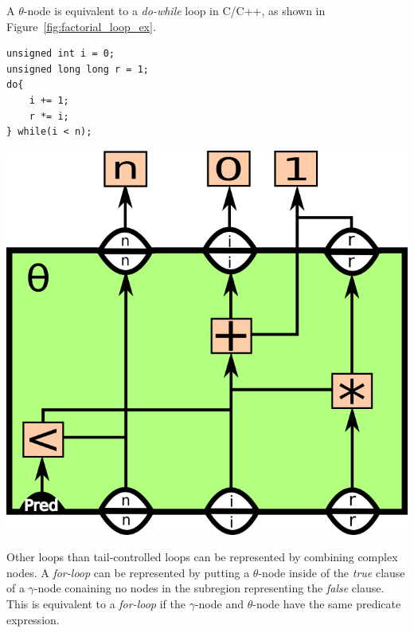\begin{itemize}
A $\theta$-node is equivalent to a \textit{do-while} loop in C/C++, as shown in
Figure~\ref{fig:factorial_loop_ex}.

\begin{centering}
	\noindent\begin{minipage}{0.36\textwidth}
		\begin{CenteredBox}
		\begin{lstlisting}[style=global_customcpp,
label={lst:fig:factorial_loop_ex}, basicstyle=\fontsize{10}{1}]
unsigned int i = 0;
unsigned long long r = 1;
do{
	i += 1;
	r *= i;
} while(i < n);
		\end{lstlisting}
		\end{CenteredBox}
	\end{minipage}
	\noindent\begin{minipage}{0.55\textwidth}
		\captionsetup{type=figure}
		\includegraphics[width=\textwidth]{figures/iterative_factorial_ex}
	\end{minipage}
	\label{fig:factorial_loop_ex}
\end{centering}

Other loops than tail-controlled loops can be represented by combining complex
nodes. A \textit{for-loop} can be represented by putting a $\theta$-node inside
of the \textit{true} clause of a $\gamma$-node conaining no nodes in the
subregion representing the \textit{false} clause. This is equivalent to a
\textit{for-loop} if the $\gamma$-node and $\theta$-node have the same predicate
expression.


\end{itemize}

